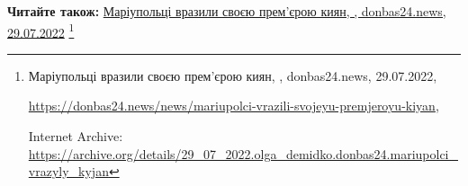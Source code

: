  
 
 
 
 

\def\pubIA{https://archive.org/details/29_07_2022.olga_demidko.donbas24.mariupolci_vrazyly_kyjan}
\def\pubTitle{Маріупольці вразили своєю прем'єрою киян}
\def\pubDate{29.07.2022}
\def\pubOrigin{https://donbas24.news/news/mariupolci-vrazili-svojeyu-premjeroyu-kiyan}
\def\pubAuthor{\pubAuthorDemidko}
\def\pubSite{donbas24.news}

\textbf{Читайте також:} \href{\pubIA}{%
\pubTitle, \pubAuthor, \pubSite, \pubDate}%
\footnote{\pubTitle, \pubAuthor, \pubSite, \pubDate, \par\url{\pubOrigin}, \par Internet Archive: \url{\pubIA}}
